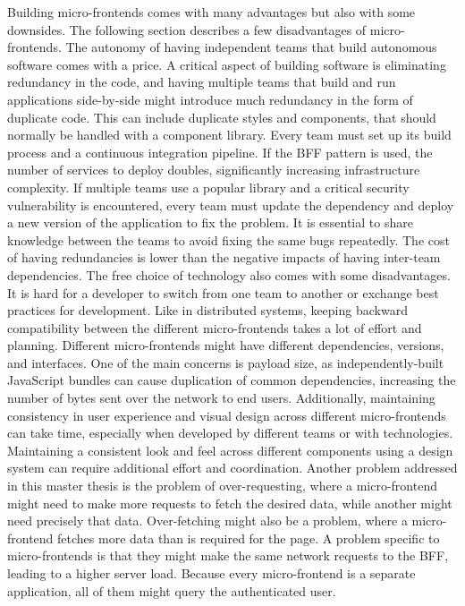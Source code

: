 Building micro-frontends comes with many advantages but also with some downsides. The following section describes a few disadvantages of micro-frontends. The autonomy of having independent teams that build autonomous software comes with a price. A critical aspect of building software is eliminating redundancy in the code, and having multiple teams that build and run applications side-by-side might introduce much redundancy in the form of duplicate code. This can include duplicate styles and components, that should normally be handled with a component library. Every team must set up its build process and a continuous integration pipeline. If the \ac{BFF} pattern is used, the number of services to deploy doubles, significantly increasing infrastructure complexity. If multiple teams use a popular library and a critical security vulnerability is encountered, every team must update the dependency and deploy a new version of the application to fix the problem. It is essential to share knowledge between the teams to avoid fixing the same bugs repeatedly. The cost of having redundancies is lower than the negative impacts of having inter-team dependencies. The free choice of technology also comes with some disadvantages. It is hard for a developer to switch from one team to another or exchange best practices for development. Like in distributed systems, keeping backward compatibility between the different micro-frontends takes a lot of effort and planning. Different micro-frontends might have different dependencies, versions, and interfaces.  \cite[17-18]{book:2020:geers:background:micro-frontends:micro-frontends-in-action} One of the main concerns is payload size, as independently-built JavaScript bundles can cause duplication of common dependencies, increasing the number of bytes sent over the network to end users. Additionally, maintaining consistency in user experience and visual design across different micro-frontends can take time, especially when developed by different teams or with technologies. Maintaining a consistent look and feel across different components using a design system can require additional effort and coordination. \cite{misc:2019:jackson:background:micro-frontends:disadvantages} Another problem addressed in this master thesis is the problem of over-requesting, where a micro-frontend might need to make more requests to fetch the desired data, while another might need precisely that data. Over-fetching might also be a problem, where a micro-frontend fetches more data than is required for the page. A problem specific to micro-frontends is that they might make the same network requests to the \ac{BFF}, leading to a higher server load. Because every micro-frontend is a separate application, all of them might query the authenticated user.








